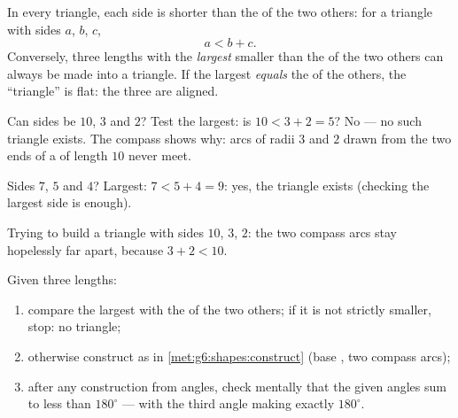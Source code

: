 \begin{theorem}\label{thm:g7:triangles:inequality}
In every triangle, each side is shorter than the  of the two
others: for a triangle with sides $a$, $b$, $c$,
\[
a < b + c .
\]
Conversely, three lengths with the \emph{largest} smaller than the 
of the two others can always be made into a triangle. If the largest
\emph{equals} the  of the others, the ``triangle'' is flat: the
three  are aligned.
\end{theorem}
\admitted

\begin{example}\label{ex:g7:triangles:inequality}
Can sides be $10$, $3$ and $2$? Test the largest: is $10 < 3 + 2 = 5$?
No --- no such triangle exists. The compass shows why: arcs of radii
$3$ and $2$ drawn from the two ends of a  of length $10$ never
meet.

Sides $7$, $5$ and $4$? Largest: $7 < 5 + 4 = 9$: yes, the triangle
exists (checking the largest side is enough).
\end{example}

\begin{omfigure}

{\small Trying to build a triangle with sides $10$, $3$, $2$: the two
compass arcs stay hopelessly far apart, because $3 + 2 < 10$.}
\end{omfigure}

\begin{method}\label{met:g7:triangles:construct}
Given three lengths:
\begin{enumerate}
  \item compare the largest with the  of the two others; if it is
        not strictly smaller, stop: no triangle;
  \item otherwise construct as in \cref{met:g6:shapes:construct}
        (base , two compass arcs);
  \item after any construction from angles, check mentally that the
        given angles sum to less than $180^\circ$ --- with the third
        angle making exactly $180^\circ$.
\end{enumerate}
\end{method}

